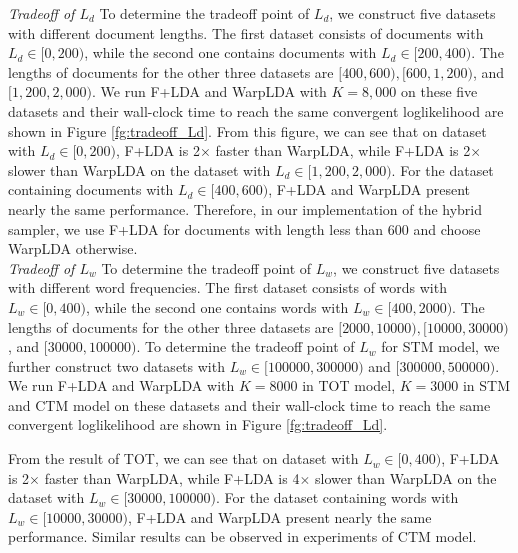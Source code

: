 \documentclass[10pt,journal,cspaper,compsoc]{IEEEtran}
\begin{document}
\noindent
{\large \em Tradeoff of $L_d$}
To determine the tradeoff point of $L_d$, we construct five datasets with different document lengths.
The first dataset consists of documents with $L_d \in [0, 200)$, while the second one contains documents with $L_d \in [200, 400)$.
The lengths of documents for the other three datasets are $[400, 600), [600, 1,200)$, and $[1,200, 2,000)$.
We run F+LDA and WarpLDA with $K=8,000$ on these five datasets and their wall-clock time to reach the same convergent loglikelihood are shown in Figure \ref{fg:tradeoff_Ld}.
From this figure, we can see that on dataset with $L_d\in [0, 200)$, F+LDA is 2$\times$ faster than WarpLDA, while F+LDA is 2$\times$ slower than WarpLDA on the dataset with $L_d\in [1,200, 2,000)$.
For the dataset containing documents with $L_d \in [400, 600)$, F+LDA and WarpLDA present nearly the same performance.
Therefore, in our implementation of the hybrid sampler, we use F+LDA for documents with length less than 600 and choose WarpLDA otherwise.
\\

\noindent
{\large \em Tradeoff of $L_w$}
To determine the tradeoff point of $L_w$, we construct five datasets with different word frequencies.
The first dataset consists of words with $L_w \in [0, 400)$, while the second one contains words with $L_w \in [400, 2000)$.
The lengths of documents for the other three datasets are $[2000, 10000), [10000, 30000)$, and $[30000, 100000)$.
To determine the tradeoff point of $L_w$ for STM model, we further 
construct two datasets with $L_w \in [100000,300000)$ and $[300000,500000)$.
We run F+LDA and WarpLDA with $K=8000$ in TOT model, $K=3000$ in STM and CTM model on these datasets and their wall-clock time to reach the same convergent loglikelihood are shown in Figure \ref{fg:tradeoff_Ld}.

From the result of TOT, we can see that on dataset with $L_w\in [0, 400)$, F+LDA is 2$\times$ faster than WarpLDA, while F+LDA is 4$\times$ slower than WarpLDA on the dataset with $L_w\in [30000, 100000)$. For the dataset containing words with $L_w \in [10000, 30000)$, F+LDA and WarpLDA present nearly the same performance.
Similar results can be observed in experiments of CTM model.
\end{document}
